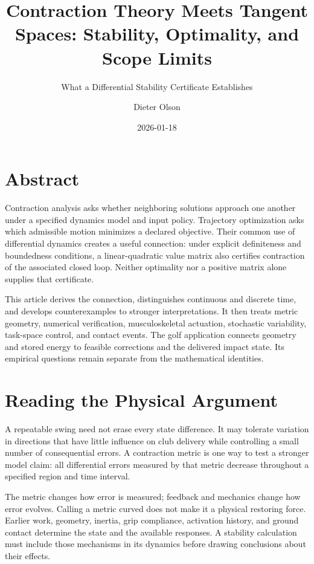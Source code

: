 \documentclass[
  10pt,
  letterpaper,
  DIV=11,
  numbers=noendperiod]{scrartcl}
\title{Contraction Theory Meets Tangent Spaces: Stability, Optimality,
and Scope Limits}
\subtitle{What a Differential Stability Certificate Establishes}
\author{Dieter Olson}
\date{2026-01-18}
\renewcommand*\contentsname{Table of contents}
\newcommand\contentsname{Table of contents}
\begin{document}
\maketitle

\renewcommand*\contentsname{Contents}
{
\hypersetup{linkcolor=}
\setcounter{tocdepth}{1}
\tableofcontents
}

\clearpage

\section*{Abstract}\label{abstract}

Contraction analysis asks whether neighboring solutions approach one
another under a specified dynamics model and input policy. Trajectory
optimization asks which admissible motion minimizes a declared
objective. Their common use of differential dynamics creates a useful
connection: under explicit definiteness and boundedness conditions, a
linear-quadratic value matrix also certifies contraction of the
associated closed loop. Neither optimality nor a positive matrix alone
supplies that certificate.

This article derives the connection, distinguishes continuous and
discrete time, and develops counterexamples to stronger interpretations.
It then treats metric geometry, numerical verification, musculoskeletal
actuation, stochastic variability, task-space control, and contact
events. The golf application connects geometry and stored energy to
feasible corrections and the delivered impact state. Its empirical
questions remain separate from the mathematical identities.

\section{Reading the Physical
Argument}\label{reading-the-physical-argument}

A repeatable swing need not erase every state difference. It may
tolerate variation in directions that have little influence on club
delivery while controlling a small number of consequential errors. A
contraction metric is one way to test a stronger model claim: all
differential errors measured by that metric decrease throughout a
specified region and time interval.

The metric changes how error is measured; feedback and mechanics change
how error evolves. Calling a metric curved does not make it a physical
restoring force. Earlier work, geometry, inertia, grip compliance,
activation history, and ground contact determine the state and the
available responses. A stability calculation must include those
mechanisms in its dynamics before drawing conclusions about their
effects.
\end{document}
